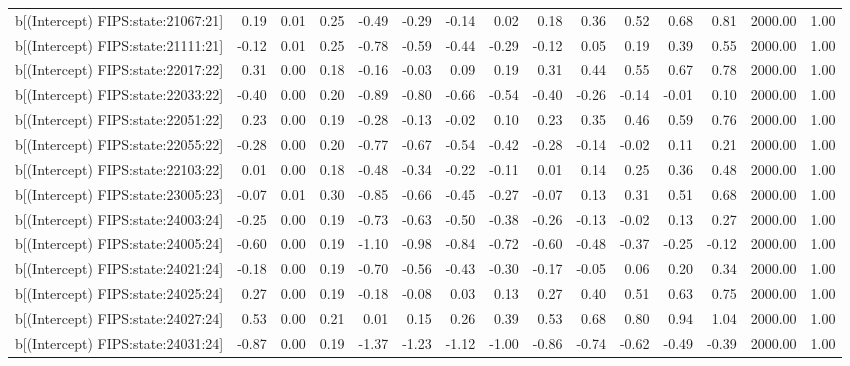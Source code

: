 \begin{table}[ht]
\begin{tabular}{rrrrrrrrrrrrrrr}
  b[(Intercept) FIPS:state:21067:21] & 0.19 & 0.01 & 0.25 & -0.49 & -0.29 & -0.14 & 0.02 & 0.18 & 0.36 & 0.52 & 0.68 & 0.81 & 2000.00 & 1.00 \\ 
  b[(Intercept) FIPS:state:21111:21] & -0.12 & 0.01 & 0.25 & -0.78 & -0.59 & -0.44 & -0.29 & -0.12 & 0.05 & 0.19 & 0.39 & 0.55 & 2000.00 & 1.00 \\ 
  b[(Intercept) FIPS:state:22017:22] & 0.31 & 0.00 & 0.18 & -0.16 & -0.03 & 0.09 & 0.19 & 0.31 & 0.44 & 0.55 & 0.67 & 0.78 & 2000.00 & 1.00 \\ 
  b[(Intercept) FIPS:state:22033:22] & -0.40 & 0.00 & 0.20 & -0.89 & -0.80 & -0.66 & -0.54 & -0.40 & -0.26 & -0.14 & -0.01 & 0.10 & 2000.00 & 1.00 \\ 
  b[(Intercept) FIPS:state:22051:22] & 0.23 & 0.00 & 0.19 & -0.28 & -0.13 & -0.02 & 0.10 & 0.23 & 0.35 & 0.46 & 0.59 & 0.76 & 2000.00 & 1.00 \\ 
  b[(Intercept) FIPS:state:22055:22] & -0.28 & 0.00 & 0.20 & -0.77 & -0.67 & -0.54 & -0.42 & -0.28 & -0.14 & -0.02 & 0.11 & 0.21 & 2000.00 & 1.00 \\ 
  b[(Intercept) FIPS:state:22103:22] & 0.01 & 0.00 & 0.18 & -0.48 & -0.34 & -0.22 & -0.11 & 0.01 & 0.14 & 0.25 & 0.36 & 0.48 & 2000.00 & 1.00 \\ 
  b[(Intercept) FIPS:state:23005:23] & -0.07 & 0.01 & 0.30 & -0.85 & -0.66 & -0.45 & -0.27 & -0.07 & 0.13 & 0.31 & 0.51 & 0.68 & 2000.00 & 1.00 \\ 
  b[(Intercept) FIPS:state:24003:24] & -0.25 & 0.00 & 0.19 & -0.73 & -0.63 & -0.50 & -0.38 & -0.26 & -0.13 & -0.02 & 0.13 & 0.27 & 2000.00 & 1.00 \\ 
  b[(Intercept) FIPS:state:24005:24] & -0.60 & 0.00 & 0.19 & -1.10 & -0.98 & -0.84 & -0.72 & -0.60 & -0.48 & -0.37 & -0.25 & -0.12 & 2000.00 & 1.00 \\ 
  b[(Intercept) FIPS:state:24021:24] & -0.18 & 0.00 & 0.19 & -0.70 & -0.56 & -0.43 & -0.30 & -0.17 & -0.05 & 0.06 & 0.20 & 0.34 & 2000.00 & 1.00 \\ 
  b[(Intercept) FIPS:state:24025:24] & 0.27 & 0.00 & 0.19 & -0.18 & -0.08 & 0.03 & 0.13 & 0.27 & 0.40 & 0.51 & 0.63 & 0.75 & 2000.00 & 1.00 \\ 
  b[(Intercept) FIPS:state:24027:24] & 0.53 & 0.00 & 0.21 & 0.01 & 0.15 & 0.26 & 0.39 & 0.53 & 0.68 & 0.80 & 0.94 & 1.04 & 2000.00 & 1.00 \\ 
  b[(Intercept) FIPS:state:24031:24] & -0.87 & 0.00 & 0.19 & -1.37 & -1.23 & -1.12 & -1.00 & -0.86 & -0.74 & -0.62 & -0.49 & -0.39 & 2000.00 & 1.00 \\ 

\end{tabular}
\end{table}
